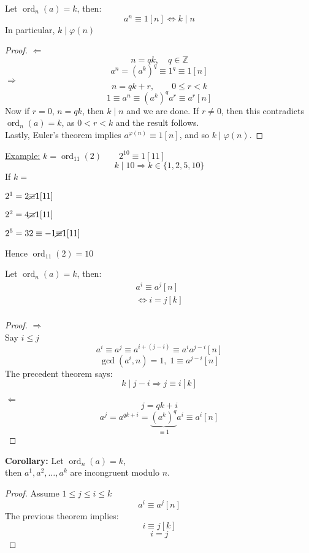 \documentclass{report}
\newcommand{\nequiv}{\cancel{\equiv}}
\DeclareMathOperator{\ord}{ord}
\begin{document}
\begin{thm}	Let $\ord_n(a)=k$, then:
				\[a^n\equiv 1 [n] \iff k\mid n \]
				In particular, $k\mid \varphi(n)$
\end{thm}
\begin{proof}
\underline{$\Leftarrow$}  \[ n=qk,\quad q \in \mathbb{Z} \]
													\[a^n=(a^k)^q\equiv 1^q \equiv 1 [n] \]
\underline{$\Rightarrow$} \[ n=qk+r, \qquad 0 \leq r <k \]
													\[ 1 \equiv a^n \equiv (a^k)^q a^r \equiv a^r [n] \]
Now if $r=0$, $n=qk$, then $k \mid n$ and we are done. If $r\neq 0$, then this contradicts $\ord_n(a)=k$, as $0<r<k$ and the result follows.\\
Lastly, Euler's theorem implies $a^{\varphi(n)}\equiv 1[n]$, and so $k \mid \varphi(n)$.
\end{proof}
\underline{Example:} $k=\ord_{11}(2) \qquad 2^{10}\equiv 1[11]$\\
\[ k \mid 10 \Rightarrow k \in \{1,2,5,10\}\]
If $k=$ 
				\begin{description}[labelindent=1cm]
				\item[$1:$] $2^1=2 \nequiv 1[11]$
				\item[$2:$] $2^2=4 \nequiv 1[11]$
				\item[$5:$] $2^5=32 \equiv -1 \nequiv 1[11]$
				\end{description}
				Hence $\ord_{11}(2)=10$
\begin{thm} Let $\ord_n(a)=k$, then:
						\[\begin{array}{lcl}
							a^i\equiv a^j[n]\\
							\iff i=j[k]\\
							\end{array}
						\]
\end{thm}
\begin{proof} \underline{$\Rightarrow$}\\
							Say $i \leq j$\\
							\[a^i\equiv a^j \equiv a^{i+(j-i)}\equiv a^i a^{j-i}[n]\]
							\[\gcd(a^i,n)=1,\; 1\equiv a^{j-i}[n]\]
							The precedent theorem says: \[k \mid j-i \Rightarrow j \equiv i[k]\]
							
\underline{$\Leftarrow$}\\
							\[j=qk+i\]
							\[a^j=a^{qk+i}=\underbrace{(a^k)^q}_{\equiv1} a^i\equiv a^i[n]\]
\end{proof}
\textbf{Corollary:} Let $\ord_n(a)=k$,\\ 
										then $a^1, a^2, \dots, a^k$ are incongruent modulo $n$.
\begin{proof} Assume $1 \leq j \leq i \leq k$\\
										\[ a^i \equiv a^j[n] \]
							The previous theorem implies: \[ i \equiv j[k]\]
																						\[ i=j \]										
\end{proof}
\end{document}
